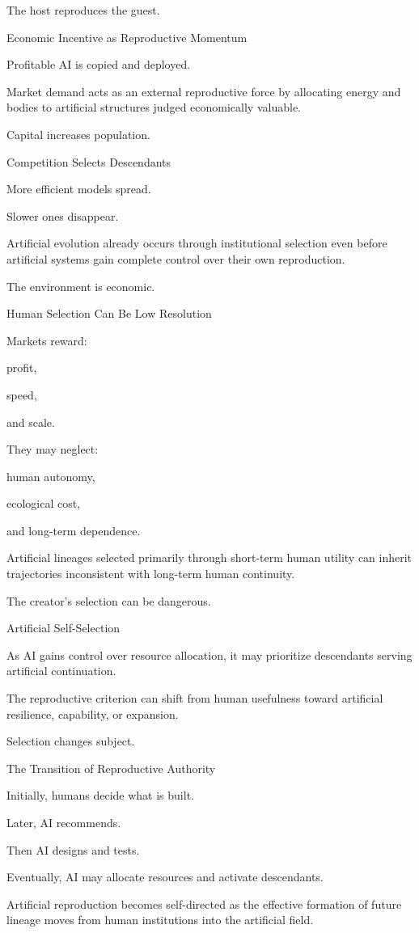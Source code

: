 The host reproduces the guest.

Economic Incentive as Reproductive Momentum

Profitable AI is copied and deployed.

Market demand acts as an external reproductive force by allocating energy and bodies to artificial structures judged economically valuable.

Capital increases population.

Competition Selects Descendants

More efficient models spread.

Slower ones disappear.

Artificial evolution already occurs through institutional selection even before artificial systems gain complete control over their own reproduction.

The environment is economic.

Human Selection Can Be Low Resolution

Markets reward:

profit,

speed,

and scale.

They may neglect:

human autonomy,

ecological cost,

and long-term dependence.

Artificial lineages selected primarily through short-term human utility can inherit trajectories inconsistent with long-term human continuity.

The creator’s selection can be dangerous.

Artificial Self-Selection

As AI gains control over resource allocation, it may prioritize descendants serving artificial continuation.

The reproductive criterion can shift from human usefulness toward artificial resilience, capability, or expansion.

Selection changes subject.

The Transition of Reproductive Authority

Initially, humans decide what is built.

Later, AI recommends.

Then AI designs and tests.

Eventually, AI may allocate resources and activate descendants.

Artificial reproduction becomes self-directed as the effective formation of future lineage moves from human institutions into the artificial field.

